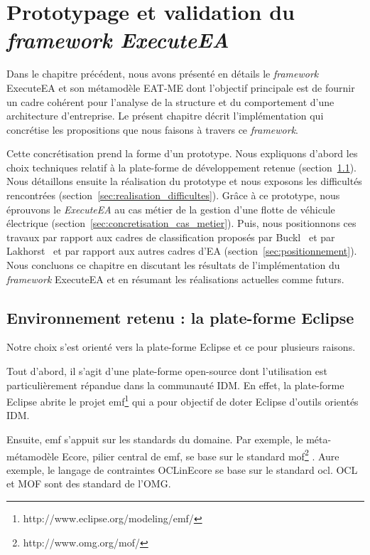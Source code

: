 \chapter{Prototypage et validation du \emph{framework ExecuteEA}}
\label{ch:implem}

\PartialToc

Dans le chapitre précédent, nous avons présenté en détails le \emph{framework}
ExecuteEA et son métamodèle EAT-ME dont l'objectif principale est de fournir
un cadre cohérent pour l'analyse de la structure et du comportement d'une
architecture d'entreprise. Le présent chapitre décrit l'implémentation qui concrétise
les propositions que nous faisons à travers ce \emph{framework}. 

Cette concrétisation prend la forme d'un prototype. Nous expliquons d'abord les
choix techniques relatif à la plate-forme de développement retenue (section~\ref{sec:Eclipse}).
Nous détaillons ensuite la réalisation du prototype et nous exposons les difficultés
rencontrées (section~\ref{sec:realisation_difficultes}). Grâce à ce prototype, nous éprouvons le \emph{ExecuteEA} au cas métier de la gestion
d'une flotte de véhicule électrique (section~\ref{sec:concretisation_cas_metier}). 
Puis, nous positionnons ces travaux par rapport aux cadres de classification
proposés par Buckl~\cite{buckl2009classifying} et par Lakhorst~\cite{lankhorst2013enterprise}
et par rapport aux autres cadres d'EA (section~\ref{sec:positionnement}).
Nous concluons ce chapitre en discutant les résultats de l'implémentation du \emph{framework} 
ExecuteEA et en résumant les réalisations actuelles comme futurs.



\section{Environnement retenu : la plate-forme Eclipse}
\label{sec:Eclipse}

Notre choix s'est orienté vers la plate-forme Eclipse et ce pour plusieurs
raisons.

Tout d'abord, il s'agit d'une plate-forme open-source dont l'utilisation est
particulièrement répandue dans la communauté IDM. En effet, la plate-forme
Eclipse abrite le projet
\gls{emf}\footnote{http://www.eclipse.org/modeling/emf/} qui a pour objectif de
doter Eclipse d'outils orientés IDM.

Ensuite, \gls{emf} s'appuit sur les standards du domaine. Par exemple, le méta-
métamodèle Ecore, pilier central de \gls{emf}, se base sur le standard
\gls{mof}\footnote{http://www.omg.org/mof/} . Aure exemple, le langage de
contraintes OCLinEcore se base sur le standard \gls{ocl}. OCL et MOF sont des
standard de l'OMG.

